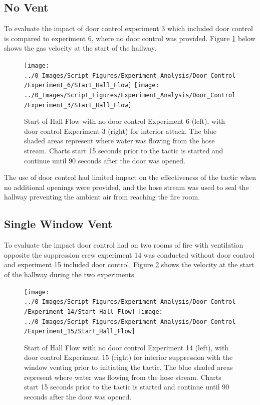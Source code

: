 \documentclass[12pt,oneside]{book}
\begin{document}
\subsection{No Vent}
To evaluate the impact of door control experiment 3 which included door control is compared to experiment 6, where no door control was provided. Figure \ref{fig:door_control_no_vent} below shows the gas velocity at the start of the hallway. 

\begin{figure}[H]
\centering
\texttt{[image: ../0\_Images/Script\_Figures/Experiment\_Analysis/Door\_Control/Experiment\_6/Start\_Hall\_Flow]}
\texttt{[image: ../0\_Images/Script\_Figures/Experiment\_Analysis/Door\_Control/Experiment\_3/Start\_Hall\_Flow]}
\caption[Door Control Effectiveness - No Ventilation]{Start of Hall Flow with no door control Experiment 6 (left), with door control Experiment 3 (right) for interior attack. The blue shaded areas represent where water was flowing from the hose stream. Charts start 15 seconds prior to the tactic is started and continue until 90 seconds after the door was opened.}
\label{fig:door_control_no_vent}
\end{figure}

The use of door control had limited impact on the effectiveness of the tactic when no additional openings were provided, and the hose stream was used to seal the hallway preventing the ambient air from reaching the fire room.

\subsection{Single Window Vent}
To evaluate the impact door control had on two rooms of fire with ventilation opposite the suppression crew experiment 14 was conducted without door control and experiment 15 included door control. Figure \ref{fig:door_control_vent} shows the velocity at the start of the hallway during the two experiments.

\begin{figure}[H]
\centering
\texttt{[image: ../0\_Images/Script\_Figures/Experiment\_Analysis/Door\_Control/Experiment\_14/Start\_Hall\_Flow]}
\texttt{[image: ../0\_Images/Script\_Figures/Experiment\_Analysis/Door\_Control/Experiment\_15/Start\_Hall\_Flow]}
\caption[Door Control Effectiveness - Window Vent]{Start of Hall Flow with no door control Experiment 14 (left), with door control Experiment 15 (right) for interior suppression with the window venting prior to initiating the tactic. The blue shaded areas represent where water was flowing from the hose stream. Charts start 15 seconds prior to the tactic is started and continue until 90 seconds after the door was opened.}
\label{fig:door_control_vent}
\end{figure}
\end{document}
